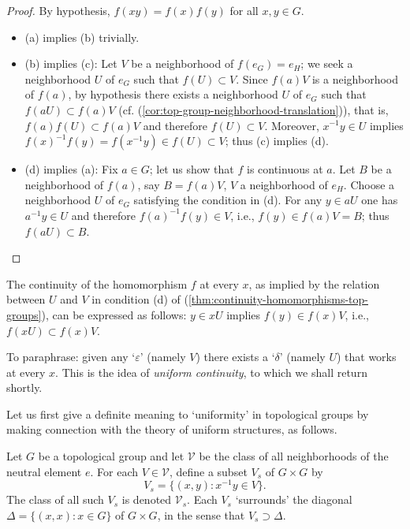 \begin{proof}
    By hypothesis, \( f(xy) = f(x)f(y) \) for all \( x, y \in G \).

    \begin{itemize}
        \item (a) implies (b) trivially.
        \item (b) implies (c): Let \( V \) be a neighborhood of \( f(e_G) = e_H \); we seek a neighborhood \( U \) of \( e_G \) such that \( f(U) \subset V \).
              Since \( f(a)V \) is a neighborhood of \( f(a) \), by hypothesis there exists a neighborhood \( U \) of \( e_G \) such that \( f(aU) \subset f(a)V \)
              (cf. (\ref{cor:top-group-neighborhood-translation})), that is, \( f(a)f(U) \subset f(a)V \) and therefore \( f(U) \subset V \).
              Moreover, \( x^{-1}y \in U \) implies \( f(x)^{-1}f(y) = f(x^{-1}y) \in f(U) \subset V \);
              thus (c) implies (d).
        \item (d) implies (a): Fix \( a \in G \); let us show that \( f \) is continuous at \( a \).
              Let \( B \) be a neighborhood of \( f(a) \), say \( B = f(a)V \), \( V \) a neighborhood of \( e_H \).
              Choose a neighborhood \( U \) of \( e_G \) satisfying the condition in (d).
              For any \( y \in aU \) one has \( a^{-1}y \in U \) and therefore \( f(a)^{-1}f(y) \in V \),
              i.e., \( f(y) \in f(a)V = B \); thus \( f(aU) \subset B \).
    \end{itemize}

\end{proof}


\begin{remark}
    The continuity of the homomorphism \( f \) at every \( x \), as implied by the relation between \( U \) and \( V \) in condition (d) of (\ref{thm:continuity-homomorphisms-top-groups}), can be expressed as follows:
    \( y \in xU \) implies \( f(y) \in f(x)V \), i.e., \( f(xU) \subset f(x)V \).

    To paraphrase: given any ‘\(\varepsilon\)’ (namely \( V \)) there exists a ‘\(\delta\)’ (namely \( U \)) that works at every \( x \).
    This is the idea of \emph{uniform continuity}, to which we shall return shortly.

    Let us first give a definite meaning to ‘uniformity’ in topological groups by making connection with the theory of uniform structures, as follows.
\end{remark}


\begin{definition}
    \label{def:group-surroundings-diagonal}

    Let \( G \) be a topological group and let \( \mathscr{V} \) be the class of all neighborhoods of the neutral element \( e \).
    For each \( V \in \mathscr{V} \), define a subset \( V_s \) of \( G \times G \) by
    \[
        V_s = \{ (x, y) : x^{-1}y \in V \}.
    \]
    The class of all such \( V_s \) is denoted \( \mathscr{V}_s \).
    Each \( V_s \) ‘surrounds’ the diagonal \( \Delta = \{ (x, x) : x \in G \} \) of \( G \times G \), in the sense that \( V_s \supset \Delta \).
\end{definition}

